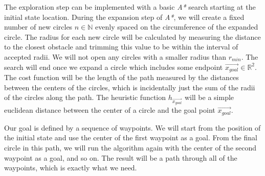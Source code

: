The exploration step can be implemented with a basic \textit{A*} search starting at the initial state location. During the expansion step of \textit{A*}, we will create a fixed number of new circles $n\in \mathbb{N}$ evenly spaced on the circumference of the expanded circle. The radius for each new circle will be calculated by measuring the distance to the closest obstacle and trimming this value to be within the interval of accepted radii. We will not open any circles with a smaller radius than $r_{min}$. The search will end once we expand a circle which includes some endpoint $\vec{x_{goal}}\in \mathbb{R}^2$. The cost function will be the length of the path measured by the distances between the centers of the circles, which is incidentally just the sum of the radii of the circles along the path. The heuristic function $h_{\vec{x_{goal}}}$ will be a simple euclidean distance between the center of a circle and the goal point $\vec{x_{goal}}$.

Our goal is defined by a sequence of waypoints. We will start from the position of the initial state and use the center of the first waypoint as a goal. From the final circle in this path, we will run the algorithm again with the center of the second waypoint as a goal, and so on. The result will be a path through all of the waypoints, which is exactly what we need.

